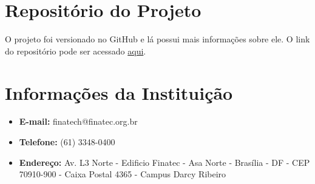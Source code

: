 \begin{anexosenv}

\partanexos

\chapter{Repositório do Projeto}
\label{appendix:anexo_certificado}

O projeto foi versionado no GitHub e lá possui mais informações sobre ele. O link do repositório pode
ser acessado \href{https://github.com/pbad-pades/pades-plugin}{aqui}.

\chapter{Informações da Instituição}

\begin{itemize}
\item \textbf{E-mail:} finatech@finatec.org.br
\item \textbf{Telefone:} (61) 3348-0400
\item \textbf{Endereço:} Av. L3 Norte - Edificio Finatec - Asa Norte - Brasília - DF - CEP 70910-900 - Caixa Postal 4365 - Campus Darcy Ribeiro
\end{itemize}

\end{anexosenv}
